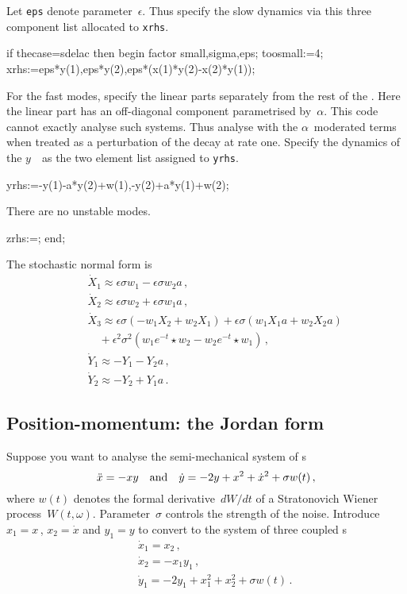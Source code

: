 \documentclass[11pt,a5paper]{article}
\newcommand{\Z}[1]{e^{#1t}{\star}}
\begin{document}
Let \verb|eps| denote parameter~$\epsilon$.
Thus specify the slow dynamics via this three component list allocated to \verb|xrhs|.
\begin{reduce}
if thecase=sdelac then begin
factor small,sigma,eps;
toosmall:=4;
xrhs:={eps*y(1),eps*y(2),eps*(x(1)*y(2)-x(2)*y(1))};
\end{reduce}

For the fast modes, specify the linear parts separately from the rest of the \sde.
Here the linear part has an off-diagonal component parametrised by~$\alpha$.
This code cannot exactly analyse such systems.
Thus analyse with the $\alpha$~moderated terms when treated as a perturbation of the decay at rate one.
Specify the dynamics of the $y$~\sde\ as the two element list assigned to \verb|yrhs|.
\begin{reduce}
yrhs:={-y(1)-a*y(2)+w(1),-y(2)+a*y(1)+w(2)};
\end{reduce}

There are no unstable modes. 
\begin{reduce}
zrhs:={};
end;
\end{reduce}

The stochastic normal form is
\begin{eqnarray*}&&
\dot X_1\approx 
\epsilon \sigma w_1 - \epsilon \sigma w_2a
\,,\\&&
\dot X_2\approx 
\epsilon \sigma w_2 + \epsilon \sigma w_1a
\,,\\&&
\dot X_3\approx 
\epsilon \sigma ( - w_1X_2 + w_2X_1) + \epsilon \sigma (w_1
X_1a + w_2X_2a) 
\\&&\quad{}+ \epsilon ^2\sigma ^2(w_1\Z{-}w_2 - 
w_2\Z{-}w_1)
\,,\\&&
\dot Y_1\approx 
 - Y_1 - Y_2a
\,,\\&&
\dot Y_2\approx 
 - Y_2 + Y_1a
\,.
\end{eqnarray*}



\subsection{Position-momentum: the Jordan form}


Suppose you want to analyse the semi-mechanical system of \sde{}s 
\begin{equation}
\ddot x=-xy \quad\mbox{and}\quad \dot y=-2y+x^2+{\dot x}^2+\sigma w(t)\,,
\end{equation}
where $w(t)$ denotes the formal derivative~$dW/dt$ of a Stratonovich Wiener process~$W(t,\omega)$.
Parameter~$\sigma$ controls the strength of the noise.
Introduce $x_1=x$\,, $x_2=\dot x$ and $y_1=y$ to convert to the system of three coupled \sde{}s
\begin{eqnarray}&&
\dot x_1=x_2 \,, \\&&
\dot x_2=-x_1y_1 \,, \\&&
\dot y_1=-2y_1+x_1^2+x_2^2+\sigma w(t)\,.
\end{eqnarray}
\end{document}
